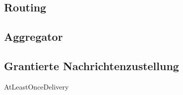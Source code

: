 \subsection{Routing}\label{sec:actor:patterns:routing}

\subsection{Aggregator}\label{sec:actor:patterns:aggregator}

\subsection{Grantierte Nachrichtenzustellung}
AtLeastOnceDelivery




